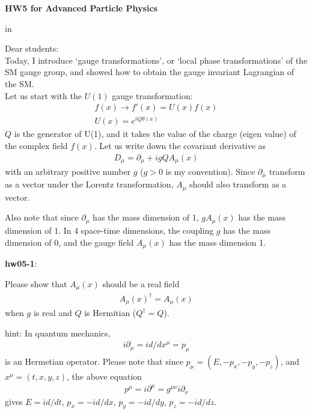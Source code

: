 \documentclass[12pt]{article}
\def\del{{\partial}}
\begin{document}
\begin{center}
{\large\bf HW5 for Advanced Particle Physics} \\

\end{center}

 in

Dear students:\\

  Today, I introduce `gauge transformations', or `local
  phase transformations' of the SM gauge group, and showed
  how to obtain the gauge invariant Lagrangian of the SM. \\

  Let us start with the $U(1)$ gauge transformation:
   \begin{eqnarray}
    f(x) \to f'(x) = U(x) f(x) \\
    U(x) = e^{ i Q \theta(x) }
   \end{eqnarray} 
    $Q$ is the generator of U(1), and it takes the value of
  the charge (eigen value) of the complex field $f(x)$.
  Let us write down the covariant derivative as
  \begin{eqnarray}
    D_\mu = \del_\mu + i g Q A_\mu(x)
  \end{eqnarray}
  with an arbitrary positive number $g$ ($g>0$ is my convention).
  Since $\del_\mu$ transform as a vector under the Lorentz
  transformation, $A_\mu$ should also transform as a vector.

  Also note that since $\del_\mu$ has the mass dimension of 1,
  $g A_\mu(x)$ has the mass dimension of 1.  In 4 space-time
  dimensions, the coupling $g$ has the mass dimension of $0$,
  and the gauge field $A_\mu(x)$ has the mass dimension 1.

{\bf hw05-1}:

  Please show that $A_\mu(x)$ should be a real field
\begin{eqnarray}
    A_\mu(x)^\dagger = A_\mu(x)
\end{eqnarray}
  when $g$ is real and $Q$ is Hermitian ($Q^\dagger = Q$).

  hint: In quantum mechanics,
\begin{eqnarray}
    i\del_\mu = i d/dx^\mu = p_\mu
\end{eqnarray}
is an Hermetian operator.  Please note that since $p_\mu = (E, -p_x, -p_y, -p_z)$, and $x^\mu = (t,x,y,z)$, the above equation
\begin{eqnarray}
    p^\mu = i\del^\mu = g^{\mu\nu} i\del_\nu
\end{eqnarray}
gives $E = i d/dt$, $p_x = -i d/dx$, $p_y = -i d/dy$, $p_z = -i d/dz$.
\end{document}
